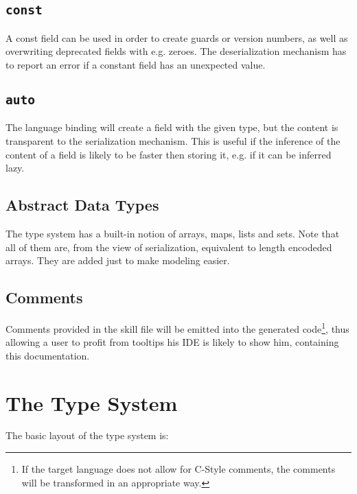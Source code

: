 \documentclass[a4paper,10pt]{article}
\begin{document}
\subsection{\texttt{const}}
A const field can be used in order to create guards or version numbers, as well as overwriting deprecated fields with e.g. zeroes. The deserialization mechanism has to report an error if a constant field has an unexpected value.

\subsection{\texttt{auto}}
The language binding will create a field with the given type, but the content is transparent to the serialization mechanism. This is useful if the inference of the content of a field is likely to be faster then storing it, e.g. if it can be inferred lazy.

\subsection{Abstract Data Types}
The type system has a built-in notion of arrays, maps, lists and sets. Note that all of them are, from the view of serialization, equivalent to length encodeded arrays. They are added just to make modeling easier. 

\subsection{Comments}
Comments provided in the skill file will be emitted into the generated code\footnote{If the target language does not allow for C-Style comments, the comments will be transformed in an appropriate way.}, thus allowing a user to profit from tooltips his IDE is likely to show him, containing this documentation. 

\section{The Type System}

The basic layout of the type system is:
\end{document}
